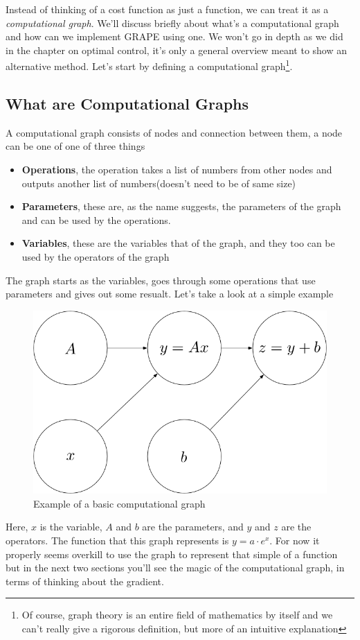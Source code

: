 \documentclass[english, a4paper, 12pt, twoside]{article}
\numberwithin{equation}{section} %
\begin{document}
Instead of thinking of a cost function as just a function, we can treat it as a \textit{computational graph}. We'll discuss briefly about what's a computational graph and how can we implement GRAPE using one. We won't go in depth as we did in the chapter on optimal control, it's only a general overview meant to show an alternative method. Let's start by defining a computational graph\footnote{Of course, graph theory is an entire field of mathematics by itself and we can't really give a rigorous definition, but more of an intuitive explanation}.
\subsection{What are Computational Graphs}
A computational graph consists of nodes and connection between them, a node can be one of one of three things
\begin{itemize}
    \item \textbf{Operations}, the operation takes a list of numbers from other nodes and outputs another list of numbers(doesn't need to be of same size) %
    \item \textbf{Parameters}, these are, as the name suggests, the parameters of the graph and can be used by the operations.
    \item \textbf{Variables}, these are the variables that of the graph, and they too can be used by the operators of the graph
\end{itemize}
The graph starts as the variables, goes through some operations that use parameters and gives out some resualt. Let's take a look at a simple example
\begin{figure}[H]
    \centering
    \includegraphics[width=0.4\columnwidth]{Example-comp-graph.png} %
    \caption{Example of a basic computational graph}
    \label{fig:example-computational-graph}
\end{figure}

Here, $x$ is the variable, $A$ and $b$ are the parameters, and $y$ and $z$ are the operators. The function that this graph represents is $y = a \cdot e^{x}$. For now it properly seems overkill to use the graph to represent that simple of a function but in the next two sections you'll see the magic of the computational graph, in terms of thinking about the gradient.
\end{document}
